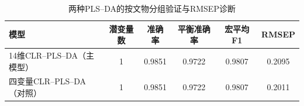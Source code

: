 \begin{table}[H]
  \centering
  \caption{两种PLS--DA的按文物分组验证与RMSEP诊断}
  \label{tab:p3-cv}
  \small
  \begin{tabular}{lccccc}
    \toprule
    模型 & 潜变量数 & 准确率 & 平衡准确率 & 宏平均F1 & RMSEP \\
    \midrule
    14维CLR--PLS--DA（主模型） & 1 & 0.9851 & 0.9722 & 0.9807 & 0.2095 \\
    四变量CLR--PLS--DA（对照） & 1 & 0.9851 & 0.9722 & 0.9807 & 0.2011 \\
    \bottomrule
  \end{tabular}
\end{table}

